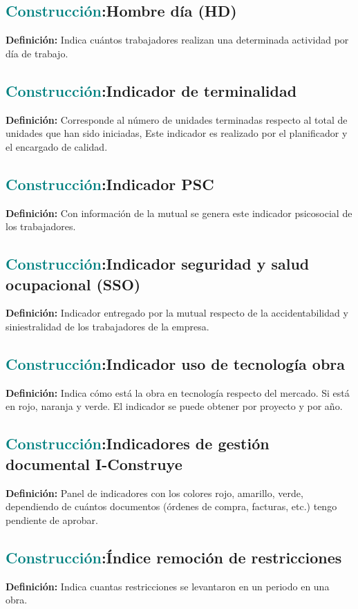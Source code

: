 \documentclass[12pt]{article}
\begin{document}
\subsection{\textcolor{teal}{Construcción}:{Hombre día (HD)}}
\textbf{Definición:} Indica cuántos trabajadores realizan una determinada actividad por día de trabajo.
\subsection{\textcolor{teal}{Construcción}:{Indicador de terminalidad}}
\textbf{Definición:} Corresponde al número de unidades terminadas respecto al total de unidades que han sido iniciadas, Este indicador es realizado por el planificador y el encargado de calidad.
\subsection{\textcolor{teal}{Construcción}:{Indicador PSC}}
\textbf{Definición:} Con información de la mutual se genera este indicador psicosocial de los trabajadores.
\subsection{\textcolor{teal}{Construcción}:{Indicador seguridad y salud ocupacional (SSO)}}
\textbf{Definición:} Indicador entregado por la mutual respecto de la accidentabilidad y siniestralidad de los trabajadores de la empresa.
\subsection{\textcolor{teal}{Construcción}:{Indicador uso de tecnología obra}}
\textbf{Definición:} Indica cómo está la obra en tecnología respecto del mercado. Si está en rojo, naranja y verde. El indicador se puede obtener por proyecto y por año.
\subsection{\textcolor{teal}{Construcción}:{Indicadores de gestión documental I-Construye}}
\textbf{Definición:} Panel de indicadores con los colores rojo, amarillo, verde, dependiendo de cuántos documentos (órdenes de compra, facturas, etc.) tengo pendiente de aprobar.
\subsection{\textcolor{teal}{Construcción}:{Índice remoción de restricciones}}
\textbf{Definición:} Indica cuantas restricciones se levantaron en un periodo en una obra.
\end{document}
